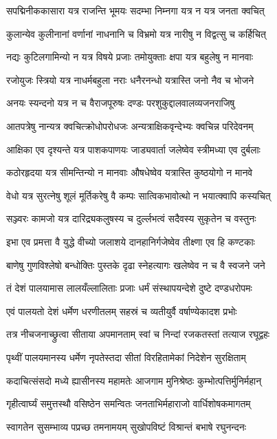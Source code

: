 \twolineshloka
{सपद्मिनीककासारा यत्र राजन्ति भूमयः}
{सदम्भा निम्नगा यत्र न यत्र जनता क्वचित्}%

\twolineshloka
{कुलान्येव कुलीनानां वर्णानां नाधनानि च}
{विभ्रमो यत्र नारीषु न विद्वत्सु च कर्हिचित्}%

\twolineshloka
{नद्यः कुटिलगामिन्यो न यत्र विषये प्रजाः}
{तमोयुक्ताः क्षपा यत्र बहुलेषु न मानवाः}%

\twolineshloka
{रजोयुजः स्त्रियो यत्र नाधर्मबहुला नराः}
{धनैरनन्धो यत्रास्ति जनो नैव च भोजने}%

\twolineshloka
{अनयः स्यन्दनो यत्र न च वैराजपूरुषः}
{दण्डः परशुकुद्दालवालव्यजनराजिषु}%

\twolineshloka
{आतपत्रेषु नान्यत्र क्वचित्क्रोधोपरोधजः}
{अन्यत्राक्षिकवृन्देभ्यः क्वचिन्न परिदेवनम्}%

\twolineshloka
{आक्षिका एव दृश्यन्ते यत्र पाशकपाणयः}
{जाड्यवार्ता जलेष्वेव स्त्रीमध्या एव दुर्बलाः}%

\twolineshloka
{कठोरहृदया यत्र सीमन्तिन्यो न मानवाः}
{औषधेष्वेव यत्रास्ति कुष्ठयोगो न मानवे}%

\twolineshloka
{वेधो यत्र सुरत्नेषु शूलं मूर्तिकरेषु वै}
{कम्पः सात्विकभावोत्थो न भयात्क्वापि कस्यचित्}%

\twolineshloka
{सञ्ज्वरः कामजो यत्र दारिद्र्यकलुषस्य च}
{दुर्ल्लभत्वं सदैवस्य सुकृतेन च वस्तुनः}%

\twolineshloka
{इभा एव प्रमत्ता वै युद्धे वीच्यो जलाशये}
{दानहानिर्गजेष्वेव तीक्ष्णा एव हि कण्टकाः}%

\twolineshloka
{बाणेषु गुणविश्लेषो बन्धोक्तिः पुस्तके दृढा}
{स्नेहत्यागः खलेष्वेव न च वै स्वजने जने}%

\twolineshloka
{तं देशं पालयामास लालयँल्लालिताः प्रजाः}
{धर्मं संस्थापयन्देशे दुष्टे दण्डधरोपमः}%

\twolineshloka
{एवं पालयतो देशं धर्मेण धरणीतलम्}
{सहस्रं च व्यतीयुर्वै वर्षाण्येकादश प्रभोः}%

\twolineshloka
{तत्र नीचजनाच्छ्रुत्वा सीताया अपमानताम्}
{स्वां च निन्दां रजकतस्तां तत्याज रघूद्वहः}%

\twolineshloka
{पृथ्वीं पालयमानस्य धर्मेण नृपतेस्तदा}
{सीतां विरहितामेकां निदेशेन सुरक्षिताम्}%

\twolineshloka
{कदाचित्संसदो मध्ये ह्यासीनस्य महामतेः}
{आजगाम मुनिश्रेष्ठः कुम्भोत्पत्तिर्मुनिर्महान्}%

\twolineshloka
{गृहीत्वार्घ्यं समुत्तस्थौ वसिष्ठेन समन्वितः}
{जनताभिर्महाराजो वार्धिशोषकमागतम्}%

\twolineshloka
{स्वागतेन सुसम्भाव्य पप्रच्छ तमनामयम्}
{सुखोपविष्टं विश्रान्तं बभाषे रघुनन्दनः}%

